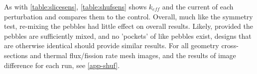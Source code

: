 

As with \ref{table:slicesens}, \ref{table:shufsens} shows $k_{eff}$ and the current of each perturbation and compares them to the control.  Overall, much like the symmetry test, re-mixing the pebbles had little effect on overall results.  Likely, provided the pebbles are sufficiently mixed, and no 'pockets' of like pebbles exist, designs that are otherwise identical should provide similar results.  For all geometry cross-sections and thermal flux/fission rate mesh images, and the results of image difference for each run, see \autoref{app-shuf}.